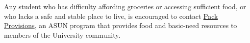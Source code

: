 Any student who has difficulty affording groceries or accessing sufficient food,
or who lacks a safe and stable place to live, is encouraged to contact
\href{https://www.unr.edu/student-engagement/support-services/pack-provisions}{Pack
Provisions}, an ASUN program that provides food and basic-need resources to members
of the University community.
